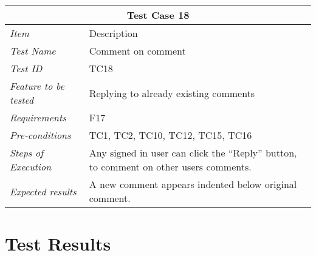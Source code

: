 %
\begin{minipage}{\linewidth}
\setlength{\tabcolsep}{15pt}
\centering
{}
\begin{tabular}{ |l|p{70mm}| }
	\hline
	\multicolumn{2}{|c|}{\cellcolor{gray!25} \textbf{Test Case 18}} \\
	\hline
	\it{\cellcolor{gray!25}Item} & {\cellcolor{gray!25} Description } \\
	\hline
	\it{\cellcolor{gray!25}Test Name } & Comment on comment \\ \hline
	\it{\cellcolor{gray!25}Test ID} & TC18 \\ \hline
	\it{\cellcolor{gray!25}Feature to be tested} & Replying to already existing comments \\ \hline
	\it{\cellcolor{gray!25}Requirements} & F17 \\ \hline
	\it{\cellcolor{gray!25}Pre-conditions} & TC1, TC2, TC10, TC12, TC15, TC16 \\ \hline
	\it{\cellcolor{gray!25}Steps of Execution} & Any signed in user can click the ``Reply'' button, to comment on other users comments.  \\ \hline
	\it{\cellcolor{gray!25}Expected results} & A new comment appears indented below original comment.  \\
	\hline
\end{tabular}
\medskip
\end{minipage}


\section{Test Results}
\label{sec:TestingResults}

